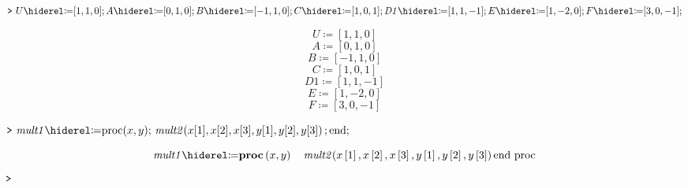 \documentclass{article}
\begin{document}
\begin{Maple Normal}

\end{Maple Normal}
\mapleinput
{$ \displaystyle \texttt{>\,} \,U \coloneqq [1,1,0];A \coloneqq [0,1,0];B \coloneqq [-1,1,0];C \coloneqq [1,0,1];\mathit{D1} \coloneqq [1,1,-1];E \coloneqq [1,-2,0];F \coloneqq [3,0,-1]; $}

\begin{dmath*}
U \coloneqq \left[1,1,0\right]
\end{dmath*}
\vspace{-\bigskipamount}
\begin{dmath*}
A \coloneqq \left[0,1,0\right]
\end{dmath*}
\vspace{-\bigskipamount}
\begin{dmath*}
B \coloneqq \left[-1,1,0\right]
\end{dmath*}
\vspace{-\bigskipamount}
\begin{dmath*}
C \coloneqq \left[1,0,1\right]
\end{dmath*}
\vspace{-\bigskipamount}
\begin{dmath*}
\mathit{D1} \coloneqq \left[1,1,-1\right]
\end{dmath*}
\vspace{-\bigskipamount}
\begin{dmath*}
E \coloneqq \left[1,-2,0\right]
\end{dmath*}
\vspace{-\bigskipamount}
\begin{dmath}\label{(4)}
F \coloneqq \left[3,0,-1\right]
\end{dmath}
\begin{Maple Normal}

\end{Maple Normal}
\mapleinput
{$ \displaystyle \texttt{>\,} \,\mathit{mult1} \coloneqq \mathrm{proc}(x ,y);\,\mathit{mult2} (x [1],x [2],x [3],y [1],y [2],y [3])\,;\mathrm{end};\, $}

\begin{dmath}\label{(5)}
\mathit{mult1} \coloneqq
\\
\boldsymbol{\mathrm{proc}}\left(x ,y \right)\quad \mathit{mult2} \! \left(x \left[1\right],x \left[2\right],x \left[3\right],y \left[1\right],y \left[2\right],y \left[3\right]\right)\quad
\\
\boldsymbol{\textrm{end proc}}
\end{dmath}
\mapleinput
{$ \displaystyle \texttt{>\,}  $}
\end{document}
